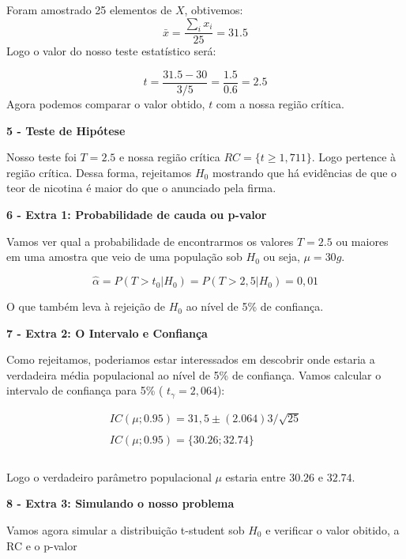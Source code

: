 \documentclass[
  letterpaper,
  DIV=11,
  numbers=noendperiod]{scrartcl}
\begin{document}
Foram amostrado 25 elementos de \(X\), obtivemos:
\[\bar{x}=\frac{\sum_i{x_i}}{25}=31.5\] Logo o valor do nosso teste
estatístico será:

\[t=\frac{31.5-30}{3/5}=\frac{1.5}{0.6}=2.5\] Agora podemos comparar o
valor obtido, \(t\) com a nossa região crítica.

\vspace{0.5cm}

\textbf{5 - Teste de Hipótese}

Nosso teste foi \(T=2.5\) e nossa região crítica
\(RC=\{t\geq 1,711 \}\). Logo pertence à região crítica. Dessa forma,
rejeitamos \(H_0\) mostrando que há evidências de que o teor de nicotina
é maior do que o anunciado pela firma.

\vspace{0.5cm}

\textbf{6 - Extra 1: Probabilidade de cauda ou p-valor}

Vamos ver qual a probabilidade de encontrarmos os valores \(T=2.5\) ou
maiores em uma amostra que veio de uma população sob \(H_0\) ou seja,
\(\mu=30g\).

\[\hat{\alpha}=P\left(T>t_{0}| H_{0}\right)=P\left(T>2,5 | H_{0}\right)=0,01\]

O que também leva à rejeição de \(H_0\) ao nível de 5\% de confiança.

\vspace{0.5cm}

\textbf{7 - Extra 2: O Intervalo e Confiança}

Como rejeitamos, poderiamos estar interessados em descobrir onde estaria
a verdadeira média populacional ao nível de 5\% de confiança. Vamos
calcular o intervalo de confiança para 5\% ( \(t_\gamma=2,064\)):

\[\begin{array}{ccc}
I C(\mu ; 0.95)=31,5 \pm(2.064) 3/\sqrt{25}
\\
\\
I C(\mu ; 0.95)=\{30.26 ; 32.74\}
\\
\\
\end{array}\]

Logo o verdadeiro parâmetro populacional \(\mu\) estaria entre \(30.26\)
e \(32.74\).

\vspace{0.5cm}

\textbf{8 - Extra 3: Simulando o nosso problema}

Vamos agora simular a distribuição t-student sob \(H_0\) e verificar o
valor obitido, a RC e o p-valor
\end{document}

